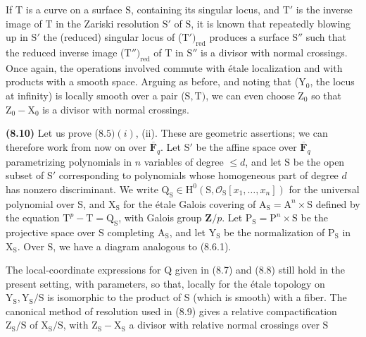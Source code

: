 \documentclass[10pt,leqno]{article}
\begin{document}
\clearpage

\label{physical-34}

\noindent If \(\mathrm{T}\) is a curve on a surface \(\mathrm{S}\), containing its singular locus, and \(\mathrm{T}'\) is the inverse image of \(\mathrm{T}\) in the Zariski resolution \(\mathrm{S}'\) of \(\mathrm{S}\), it is known that repeatedly blowing up in \(\mathrm{S}'\) the (reduced) singular locus of (\(\mathrm{T}')_{\mathrm{red}}\) produces a surface \(\mathrm{S}''\) such that the reduced inverse image (\(\mathrm{T}'')_{\mathrm{red}}\) of \(\mathrm{T}\) in \(\mathrm{S}''\) is a divisor with normal crossings. Once again, the operations involved commute with étale localization and with products with a smooth space. Arguing as before, and noting that (\(\mathrm{Y}_{0}\), the locus at infinity) is locally smooth over a pair (\(\mathrm{S},\mathrm{T})\), we can even choose \(\mathrm{Z}_{0}\) so that \(\mathrm{Z}_{0}-\mathrm{X}_{0}\) is a divisor with normal crossings.\par

\noindent \textbf{(8.10)} Let us prove (\(8.5) (i)\), (ii). These are geometric assertions; we can therefore work from now on over \(\overline{\mathbf{F}}_{q}\). Let \(\mathrm{S}'\) be the affine space over \(\overline{\mathbf{F}}_{q}\) parametrizing polynomials in \(n\) variables of degree \(\leq  d\), and let \(\mathrm{S}\) be the open subset of \(\mathrm{S}'\) corresponding to polynomials whose homogeneous part of degree \(d\) has nonzero discriminant. We write \(\mathrm{Q}_{\mathrm{S}} \in  \mathrm{H}^{0}(\mathrm{S},\mathcal{O}_{\mathrm{S}}[x_{1},\ldots ,x_{n}])\) for the universal polynomial over \(\mathrm{S}\), and \(\mathrm{X}_{\mathrm{S}}\) for the étale Galois covering of \(\mathrm{A}_{\mathrm{S}} = \mathrm{A}^{n} \times  \mathrm{S}\) defined by the equation \(\mathrm{T}^{p}-\mathrm{T} = \mathrm{Q}_{\mathrm{S}}\), with Galois group \(\mathbf{Z}/p\). Let \(\mathrm{P}_{\mathrm{S}} = \mathrm{P}^{n} \times  \mathrm{S}\) be the projective space over \(\mathrm{S}\) completing \(\mathrm{A}_{\mathrm{S}}\), and let \(\mathrm{Y}_{\mathrm{S}}\) be the normalization of \(\mathrm{P}_{\mathrm{S}}\) in \(\mathrm{X}_{\mathrm{S}}\). Over \(\mathrm{S}\), we have a diagram analogous to (8.6.1).\par

\noindent The local-coordinate expressions for \(\mathrm{Q}\) given in (8.7) and (8.8) still hold in the present setting, with parameters, so that, locally for the étale topology on \(\mathrm{Y}_{\mathrm{S}}, \mathrm{Y}_{\mathrm{S}}/\mathrm{S}\) is isomorphic to the product of \(\mathrm{S}\) (which is smooth) with a fiber. The canonical method of resolution used in (8.9) gives a relative compactification \(\mathrm{Z}_{\mathrm{S}}/\mathrm{S}\) of \(\mathrm{X}_{\mathrm{S}}/\mathrm{S}\), with \(\mathrm{Z}_{\mathrm{S}}-\mathrm{X}_{\mathrm{S}}\) a divisor with relative normal crossings over \(\mathrm{S}\)\par
\end{document}
